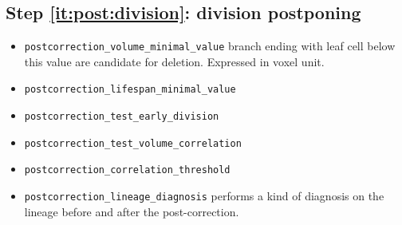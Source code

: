 \subsection{Step \ref{it:post:division}: division postponing}

      
\begin{itemize}
\itemsep -0.5ex
\item \texttt{postcorrection\_volume\_minimal\_value}
  branch ending with leaf cell below this value are candidate for deletion. Expressed in voxel unit.
\item \texttt{postcorrection\_lifespan\_minimal\_value}
\item \texttt{postcorrection\_test\_early\_division}
\item \texttt{postcorrection\_test\_volume\_correlation}
\item \texttt{postcorrection\_correlation\_threshold}
\item \texttt{postcorrection\_lineage\_diagnosis}
  performs a kind of diagnosis on the lineage before and after the post-correction.
\end{itemize}






